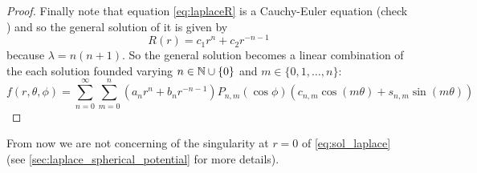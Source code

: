 \documentclass[../main.tex]{subfiles}
\begin{document}
\begin{proof}
  Finally note that equation \cref{eq:laplaceR} is a Cauchy-Euler equation (check \cite{wiki:cauchy-euler}) and so the general solution of it is given by
  \begin{equation}
    R(r) = c_1 r^{n} + c_2 r^{-n-1}
  \end{equation}
  because $\lambda = n(n+1)$. So the general solution becomes a linear combination of the each solution founded varying $n\in\mathbb{N}\cup\{0\}$ and $m\in\{0,1,\dots,n\}$:
  \begin{equation}
    f(r,\theta,\phi) = \sum_{n=0}^\infty \sum_{m=0}^n (a_n r^{n} +b_{n}r^{-n-1})P_{n,m}(\cos\phi) (c_{n,m}\cos(m\theta)+s_{n,m}\sin(m\theta))
  \end{equation}
\end{proof}
From now we are not concerning of the singularity at $r=0$ of \cref{eq:sol_laplace} (see \cref{sec:laplace_spherical_potential} for more details).
\end{document}
